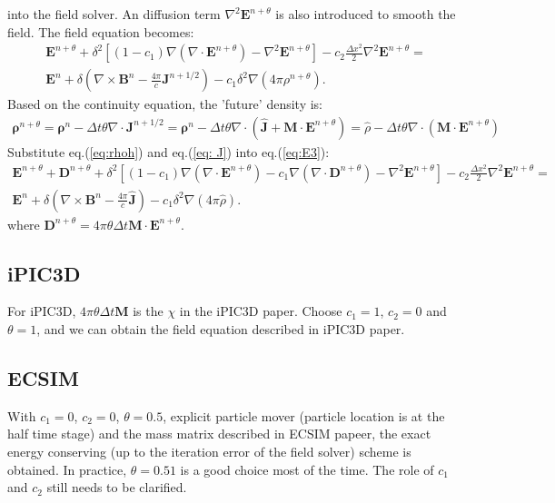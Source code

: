 \documentclass[a4paper, 11pt]{article}
\begin{document}
into the field solver. An diffusion term $\nabla^2 \mathbf{E}^{n+\theta}$ is also introduced to smooth the field. The field equation becomes:
\begin{equation}
\begin{split}
\mathbf{E}^{n+\theta} + \delta^2 \left[(1-c_1) \nabla(\nabla \cdot \mathbf{E}^{n+\theta}) -\nabla ^2 \mathbf{E}^{n+\theta}\right] - c_2\frac{\Delta x^2}{2} \nabla ^2 \mathbf{E}^{n+\theta} = \\
\mathbf{E}^{n} + \delta(\nabla \times \mathbf{B}^n - \frac{4\pi}{c}\mathbf{J}^{n+1/2})-c_1\delta^2\nabla(4\pi\rho^{n+\theta}).
\end{split}
\label{eq:E3}
\end{equation}
Based on the continuity equation, the 'future' density is:
\begin{eqnarray}
\mathbf{\rho}^{n+\theta} = \mathbf{\rho}^n - \Delta t \theta \nabla\cdot \mathbf{J}^{n+1/2} = \mathbf{\rho}^n - \Delta t \theta \nabla\cdot (\hat{\mathbf{J}} + \mathbf{M} \cdot \mathbf{E}^{n+\theta}) = \hat{\rho} - \Delta t \theta \nabla \cdot (\mathbf{M} \cdot \mathbf{E}^{n+\theta})
\label{eq:rhoh}
\end{eqnarray}
Substitute eq.(\ref{eq:rhoh}) and eq.(\ref{eq: J}) into eq.(\ref{eq:E3}):
\begin{equation}
\begin{split}
\mathbf{E}^{n+\theta} + \mathbf{D}^{n+\theta}+ \delta^2 \left[(1-c_1) \nabla(\nabla \cdot \mathbf{E}^{n+\theta}) -  c_1\nabla(\nabla \cdot \mathbf{D}^{n+\theta}) - \nabla ^2 \mathbf{E}^{n+\theta}\right]- c_2\frac{\Delta x^2}{2} \nabla ^2 \mathbf{E}^{n+\theta} =\\ 
\mathbf{E}^{n} + \delta(\nabla \times \mathbf{B}^n - \frac{4\pi}{c}\hat{\mathbf{J}})-c_1\delta^2\nabla(4\pi\hat{\rho}).
\end{split}
\label{eq:E4}
\end{equation}
where $\mathbf{D}^{n+\theta} = 4\pi\theta\Delta t\mathbf{M}\cdot \mathbf{E}^{n+\theta}$.

\subsection{iPIC3D}
For iPIC3D, $4\pi\theta\Delta t\mathbf{M}$ is the $\chi$ in the iPIC3D paper. Choose $c_1=1$, $c_2=0$ and $\theta = 1$, and we can obtain the field equation described in iPIC3D paper. 

\subsection{ECSIM}
With $c_1= 0$, $c_2=0$, $\theta = 0.5$, explicit particle mover (particle location is at the half time stage) and the mass matrix described in ECSIM papeer, the exact energy conserving (up to the iteration error of the field solver) scheme is obtained. In practice, $\theta = 0.51$ is a good choice most of the time. The role of $c_1$ and $c_2$ still needs to be clarified. 
\end{document}
